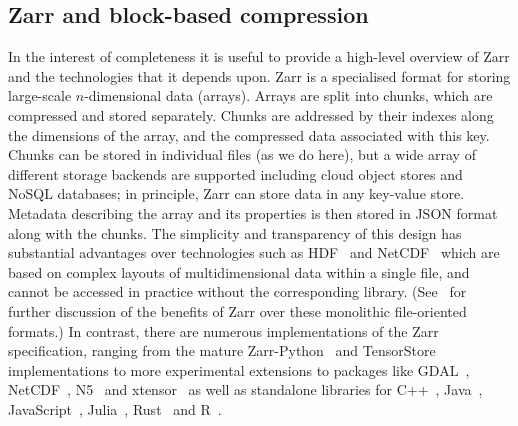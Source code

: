 \documentclass[a4paper,num-refs]{oup-contemporary}
\begin{document}
\subsection{Zarr and block-based compression}
In the interest of completeness it is useful to provide a high-level overview
of Zarr and the technologies that it depends upon. Zarr is a specialised format
for storing large-scale $n$-dimensional data (arrays). Arrays
are split into chunks, which are compressed and stored separately. Chunks are 
addressed by their indexes along the dimensions of the array, and the 
compressed data associated with this key. Chunks can
be stored in individual files (as we do here), but a wide array of different
storage backends are supported including cloud object stores 
and NoSQL databases;
in principle, Zarr can store data in any key-value store.
Metadata describing the array and its properties is then stored 
in JSON format along with the chunks. 
The simplicity and transparency
of this design has substantial advantages over technologies
such as HDF~\citep{folk2011overview} and 
NetCDF~\citep{rew1990netcdf} which are based on complex
layouts of multidimensional data within a single file,
and cannot be accessed in practice without the corresponding library.
(See~\cite{abernathey2021cloud} for further discussion of the benefits
of Zarr over these monolithic file-oriented formats.)
In contrast, there are numerous implementations 
of the Zarr specification, ranging 
from the mature Zarr-Python~\citep{zarrpython}
and TensorStore~\citep{tensorstore} implementations
to more experimental extensions to packages like
GDAL~\citep{gdal_zarr},
NetCDF~\citep{netcfd_c},
N5~\citep{n5zarr}
and xtensor~\citep{xtensor_zarr}
as well as  standalone libraries for 
C++~\citep{ruan2024image}, 
Java~\cite{jzarr},
JavaScript~\cite{zarrjs},
Julia~\cite{zarrjl}, Rust~\citep{zarrs}
and R~\cite{pizzarr}.
\end{document}
